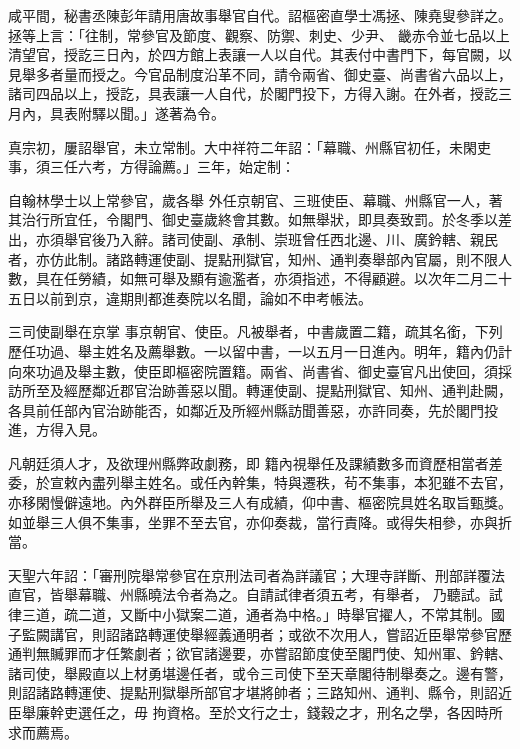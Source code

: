 \begin{pinyinscope}
 咸平間，秘書丞陳彭年請用唐故事舉官自代。詔樞密直學士馮拯、陳堯叟參詳之。拯等上言：「往制，常參官及節度、觀察、防禦、刺史、少尹、
 畿赤令並七品以上清望官，授訖三日內，於四方館上表讓一人以自代。其表付中書門下，每官闕，以見舉多者量而授之。今官品制度沿革不同，請令兩省、御史臺、尚書省六品以上，諸司四品以上，授訖，具表讓一人自代，於閣門投下，方得入謝。在外者，授訖三月內，具表附驛以聞。」遂著為令。



 真宗初，屢詔舉官，未立常制。大中祥符二年詔：「幕職、州縣官初任，未閑吏事，須三任六考，方得論薦。」三年，始定制：



 自翰林學士以上常參官，歲各舉
 外任京朝官、三班使臣、幕職、州縣官一人，著其治行所宜任，令閣門、御史臺歲終會其數。如無舉狀，即具奏致罰。於冬季以差出，亦須舉官後乃入辭。諸司使副、承制、崇班曾任西北邊、川、廣鈐轄、親民者，亦仿此制。諸路轉運使副、提點刑獄官，知州、通判奏舉部內官屬，則不限人數，具在任勞績，如無可舉及顯有逾濫者，亦須指述，不得顧避。以次年二月二十五日以前到京，違期則都進奏院以名聞，論如不申考帳法。



 三司使副舉在京掌
 事京朝官、使臣。凡被舉者，中書歲置二籍，疏其名銜，下列歷任功過、舉主姓名及薦舉數。一以留中書，一以五月一日進內。明年，籍內仍計向來功過及舉主數，使臣即樞密院置籍。兩省、尚書省、御史臺官凡出使回，須採訪所至及經歷鄰近郡官治跡善惡以聞。轉運使副、提點刑獄官、知州、通判赴闕，各具前任部內官治跡能否，如鄰近及所經州縣訪聞善惡，亦許同奏，先於閣門投進，方得入見。



 凡朝廷須人才，及欲理州縣弊政劇務，即
 籍內視舉任及課績數多而資歷相當者差委，於宣敕內盡列舉主姓名。或任內幹集，特與遷秩，茍不集事，本犯雖不去官，亦移閑慢僻遠地。內外群臣所舉及三人有成績，仰中書、樞密院具姓名取旨甄獎。如並舉三人俱不集事，坐罪不至去官，亦仰奏裁，當行責降。或得失相參，亦與折當。



 天聖六年詔：「審刑院舉常參官在京刑法司者為詳議官；大理寺詳斷、刑部詳覆法直官，皆舉幕職、州縣曉法令者為之。自請試律者須五考，有舉者，
 乃聽試。試律三道，疏二道，又斷中小獄案二道，通者為中格。」時舉官擢人，不常其制。國子監闕講官，則詔諸路轉運使舉經義通明者；或欲不次用人，嘗詔近臣舉常參官歷通判無贓罪而才任繁劇者；欲官諸邊要，亦嘗詔節度使至閣門使、知州軍、鈐轄、諸司使，舉殿直以上材勇堪邊任者，或令三司使下至天章閣待制舉奏之。邊有警，則詔諸路轉運使、提點刑獄舉所部官才堪將帥者；三路知州、通判、縣令，則詔近臣舉廉幹吏選任之，毋
 拘資格。至於文行之士，錢穀之才，刑名之學，各因時所求而薦焉。




\end{pinyinscope}
